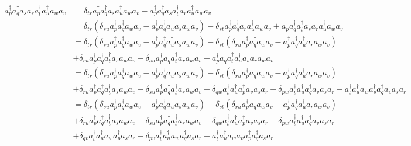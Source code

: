 \documentclass[prb,amsmath,amsfonts,amssymb]{revtex4}
\begin{document}
\begin{align}
	a^\dag_p a^\dag_q a_s a_r a^\dag_t a^\dag_u a_w a_v &= \delta_{tr} a^\dag_p a^\dag_q a_s  a^\dag_u a_w a_v - a^\dag_p a^\dag_q a_s a^\dag_t  a_r a^\dag_u a_w a_v \nonumber\\
	&= \delta_{tr} (\delta_{su} a^\dag_p a^\dag_q a_w a_v - a^\dag_p a^\dag_q  a^\dag_u a_s  a_w a_v ) - \delta_{st} a^\dag_p a^\dag_q  a_r a^\dag_u a_w a_v + a^\dag_p a^\dag_q a^\dag_t a_s   a_r a^\dag_u a_w a_v \nonumber\\
	&= \delta_{tr} (\delta_{su} a^\dag_p a^\dag_q a_w a_v - a^\dag_p a^\dag_q  a^\dag_u a_s  a_w a_v ) - \delta_{st}( \delta_{ru} a^\dag_p a^\dag_q   a_w a_v -  a^\dag_p a^\dag_q a^\dag_u a_r  a_w a_v) \nonumber\\
	&+ \delta _{ru} a^\dag_p a^\dag_q a^\dag_t a_s   a_w a_v 	 
	- \delta_{su} a_p^\dag a_q^\dag a_t^\dag 	a_r a_w a_v
	+a_p^\dag a_q^\dag a_t^\dag a_u^\dag  a_s 	a_r a_w a_v\nonumber\\
	&= \delta_{tr} (\delta_{su} a^\dag_p a^\dag_q a_w a_v - a^\dag_p a^\dag_q  a^\dag_u a_s  a_w a_v ) - \delta_{st}( \delta_{ru} a^\dag_p a^\dag_q   a_w a_v -  a^\dag_p a^\dag_q a^\dag_u a_r  a_w a_v) \nonumber\\
	&+ \delta _{ru} a^\dag_p a^\dag_q a^\dag_t a_s   a_w a_v 	 
	- \delta_{su} a_p^\dag a_q^\dag a_t^\dag 	a_r a_w a_v
	+ \delta_{qw}a_t^\dag a_u^\dag a_p^\dag a_v  a_s 	a_r
	- \delta_{pw }a_t^\dag a_u^\dag a_q^\dag  a_v  a_s 	a_r
	-a_t^\dag a_u^\dag   a_w a_p^\dag a_q^\dag  a_v  a_s 	a_r\nonumber\\	
	&= \delta_{tr} (\delta_{su} a^\dag_p a^\dag_q a_w a_v - a^\dag_p a^\dag_q  a^\dag_u a_s  a_w a_v ) - \delta_{st}( \delta_{ru} a^\dag_p a^\dag_q   a_w a_v -  a^\dag_p a^\dag_q a^\dag_u a_r  a_w a_v) \nonumber\\
	&+ \delta _{ru} a^\dag_p a^\dag_q a^\dag_t a_s   a_w a_v 	 
	- \delta_{su} a_p^\dag a_q^\dag a_t^\dag 	a_r a_w a_v
	+ \delta_{qw}a_t^\dag a_u^\dag a_p^\dag a_v  a_s 	a_r
	- \delta_{pw }a_t^\dag a_u^\dag a_q^\dag  a_v  a_s 	a_r
	\nonumber\\
	&+\delta_{qv} a_t^\dag a_u^\dag   a_w a_p^\dag   a_s 	a_r
	-\delta_{pv }a_t^\dag a_u^\dag   a_w  a_q^\dag  a_s 	a_r
	+a_t^\dag a_u^\dag   a_w  a_v  a_p^\dag  a_q^\dag  a_s 	a_r\nonumber\\	\end{align}
	\fi
	
\end{document}

